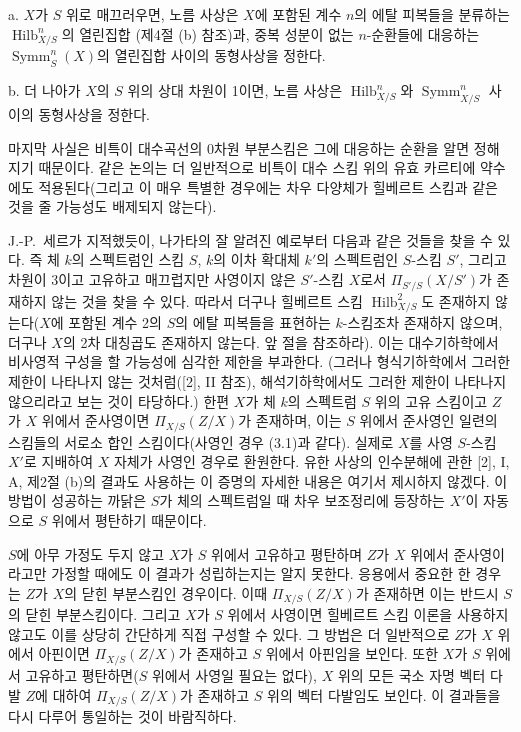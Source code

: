 \medskip
\noindent a. $X$가 $S$ 위로 매끄러우면, 노름 사상은 $X$에 포함된 계수
$n$의 에탈 피복들을 분류하는 $\operatorname{Hilb}^n_{X/S}$의 열린집합
(제4절 (b) 참조)과, 중복 성분이 없는 $n$-순환들에 대응하는
$\operatorname{Symm}^n_S(X)$의 열린집합 사이의 동형사상을 정한다.

\medskip
\noindent b. 더 나아가 $X$의 $S$ 위의 상대 차원이 1이면, 노름 사상은
$\operatorname{Hilb}^n_{X/S}$와 $\operatorname{Symm}^n_{X/S}$ 사이의
동형사상을 정한다.

마지막 사실은 비특이 대수곡선의 0차원 부분스킴은 그에 대응하는 순환을
알면 정해지기 때문이다. 같은 논의는 더 일반적으로 비특이 대수 스킴 위의
유효 카르티에 약수에도 적용된다(그리고 이 매우 특별한 경우에는 차우
다양체가 힐베르트 스킴과 같은 것을 줄 가능성도 배제되지 않는다).


J.-P.~세르가 지적했듯이, 나가타의 잘 알려진 예로부터 다음과 같은 것들을
찾을 수 있다. 즉 체 $k$의 스펙트럼인 스킴 $S$, $k$의 이차 확대체 $k'$의
스펙트럼인 $S$-스킴 $S'$, 그리고 차원이 3이고 고유하고 매끄럽지만
사영이지 않은 $S'$-스킴 $X$로서 $\Pi_{S'/S}(X/S')$가 존재하지 않는 것을
찾을 수 있다. 따라서 더구나 힐베르트 스킴
$\operatorname{Hilb}^2_{X/S}$도 존재하지 않는다($X$에 포함된 계수 2의
$S$의 에탈 피복들을 표현하는 $k$-스킴조차 존재하지 않으며, 더구나 $X$의
2차 대칭곱도 존재하지 않는다. 앞 절을 참조하라). 이는 대수기하학에서
비사영적 구성을 할 가능성에 심각한 제한을 부과한다. (그러나 형식기하학에서
그러한 제한이 나타나지 않는 것처럼([2], II 참조), 해석기하학에서도 그러한
제한이 나타나지 않으리라고 보는 것이 타당하다.) 한편 $X$가 체 $k$의
스펙트럼 $S$ 위의 고유 스킴이고 $Z$가 $X$ 위에서 준사영이면
$\Pi_{X/S}(Z/X)$가 존재하며, 이는 $S$ 위에서 준사영인 일련의 스킴들의
서로소 합인 스킴이다(사영인 경우 (3.1)과 같다). 실제로 $X$를 사영
$S$-스킴 $X'$로 지배하여 $X$ 자체가 사영인 경우로 환원한다. 유한 사상의
인수분해에 관한 [2], I, A, 제2절 (b)의 결과도 사용하는 이 증명의 자세한
내용은 여기서 제시하지 않겠다. 이 방법이 성공하는 까닭은 $S$가 체의
스펙트럼일 때 차우 보조정리에 등장하는 $X'$이 자동으로 $S$ 위에서
평탄하기 때문이다.

$S$에 아무 가정도 두지 않고 $X$가 $S$ 위에서 고유하고 평탄하며 $Z$가
$X$ 위에서 준사영이라고만 가정할 때에도 이 결과가 성립하는지는 알지
못한다. 응용에서 중요한 한 경우는 $Z$가 $X$의 닫힌 부분스킴인 경우이다.
이때 $\Pi_{X/S}(Z/X)$가 존재하면 이는 반드시 $S$의 닫힌 부분스킴이다.
그리고 $X$가 $S$ 위에서 사영이면 힐베르트 스킴 이론을 사용하지 않고도
이를 상당히 간단하게 직접 구성할 수 있다.
그 방법은 더 일반적으로 $Z$가 $X$ 위에서 아핀이면
$\Pi_{X/S}(Z/X)$가 존재하고 $S$ 위에서 아핀임을 보인다. 또한 $X$가 $S$
위에서 고유하고 평탄하면($S$ 위에서 사영일 필요는 없다), $X$ 위의 모든
국소 자명 벡터 다발 $Z$에 대하여 $\Pi_{X/S}(Z/X)$가 존재하고 $S$ 위의
벡터 다발임도 보인다. 이 결과들을 다시 다루어 통일하는 것이 바람직하다.

